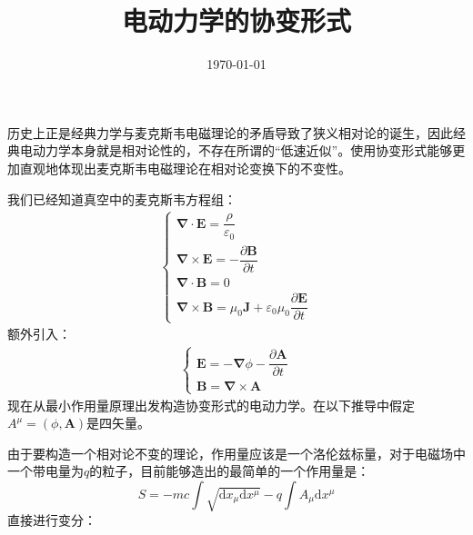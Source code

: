 \documentclass[12pt, a4paper, oneside]{ctexart}
\title{\Huge 电动力学的协变形式}
\date{\today}
\begin{document}
	\maketitle
	历史上正是经典力学与麦克斯韦电磁理论的矛盾导致了狭义相对论的诞生，因此经典电动力学本身就是相对论性的，不存在所谓的“低速近似”。使用协变形式能够更加直观地体现出麦克斯韦电磁理论在相对论变换下的不变性。\par
	我们已经知道真空中的麦克斯韦方程组：
	\begin{equation}
		\begin{aligned}
			\begin{cases}
				\boldsymbol{\nabla} \cdot \boldsymbol{E} = \dfrac{\rho}{\varepsilon_{0}} \\
				\boldsymbol{\nabla} \times \boldsymbol{E} = -\dfrac{\partial \boldsymbol{B}}{\partial t} \\
				\boldsymbol{\nabla} \cdot \boldsymbol{B} = 0 \\
				\boldsymbol{\nabla} \times \boldsymbol{B} = \mu_{0}\boldsymbol{J}+\varepsilon_{0}\mu_{0}\dfrac{\partial \boldsymbol{E}}{\partial t}
			\end{cases}
		\end{aligned}
	\end{equation}
	\quad\quad 额外引入：
	\begin{equation}
		\begin{aligned}
			\begin{cases}
				\boldsymbol{E} = -\boldsymbol{\nabla}\phi-\dfrac{\partial\boldsymbol{A}}{\partial t} \\
				\boldsymbol{B} = \boldsymbol{\nabla}\times\boldsymbol{A}
			\end{cases}
		\end{aligned}
	\end{equation}
	 \quad\quad 现在从最小作用量原理出发构造协变形式的电动力学。在以下推导中假定$A^{\mu}=\left(\phi, \boldsymbol{A}\right)$是四矢量。\par 
	由于要构造一个相对论不变的理论，作用量应该是一个洛伦兹标量，对于电磁场中一个带电量为$q$的粒子，目前能够造出的最简单的一个作用量是：
	\begin{equation}
		S=-mc\int \sqrt{\mathrm{d}x_{\mu}\mathrm{d}x^{\mu}}-q\int A_{\mu}\mathrm{d}x^{\mu}
	\end{equation}
	\quad\quad 直接进行变分：
\end{document}
